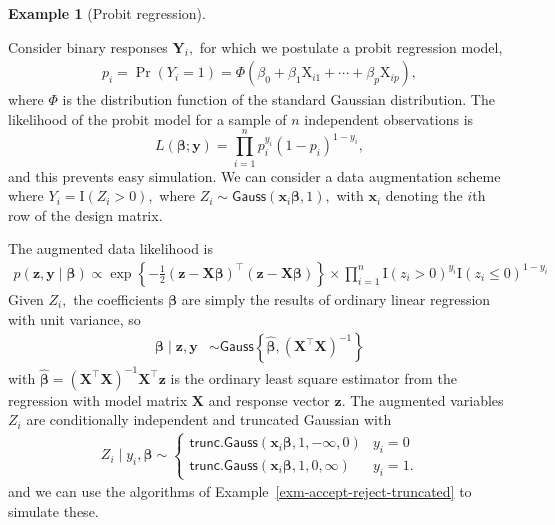 \documentclass[
  11pt,
  letterpaper,
]{scrbook}
\theoremstyle{definition}
\newtheorem{example}{Example}[chapter]
\theoremstyle{plain}
\theoremstyle{plain}
\theoremstyle{plain}
\theoremstyle{definition}
\theoremstyle{definition}
\theoremstyle{plain}
\theoremstyle{plain}
\theoremstyle{remark}
\begin{document}
\begin{example}[Probit
regression]\protect\hypertarget{exm-probit-regression}{}\label{exm-probit-regression}

Consider binary responses \(\boldsymbol{Y}_i,\) for which we postulate a
probit regression model, \begin{align*}
p_i = \Pr(Y_i=1) = \Phi(\beta_0 + \beta_1 \mathrm{X}_{i1} + \cdots + \beta_p\mathrm{X}_{ip}),
\end{align*} where \(\Phi\) is the distribution function of the standard
Gaussian distribution. The likelihood of the probit model for a sample
of \(n\) independent observations is
\[L(\boldsymbol{\beta}; \boldsymbol{y}) = \prod_{i=1}^n p_i^{y_i}(1-p_i)^{1-y_i},\]
and this prevents easy simulation. We can consider a data augmentation
scheme where \(Y_i = \mathrm{I}(Z_i > 0),\) where
\(Z_i \sim \mathsf{Gauss}(\mathbf{x}_i\boldsymbol{\beta}, 1),\) with
\(\mathbf{x}_i\) denoting the \(i\)th row of the design matrix.

The augmented data likelihood is \begin{align*}
p(\boldsymbol{z}, \boldsymbol{y} \mid \boldsymbol{\beta}) \propto \exp\left\{-\frac{1}{2}(\boldsymbol{z} - \mathbf{X}\boldsymbol{\beta})^\top(\boldsymbol{z} - \mathbf{X}\boldsymbol{\beta})\right\} \times \prod_{i=1}^n \mathrm{I}(z_i > 0)^{y_i}\mathrm{I}(z_i \le 0)^{1-y_i}
\end{align*} Given \(Z_i,\) the coefficients \(\boldsymbol{\beta}\) are
simply the results of ordinary linear regression with unit variance, so
\begin{align*}
\boldsymbol{\beta} \mid \boldsymbol{z}, \boldsymbol{y} &\sim \mathsf{Gauss}\left\{\widehat{\boldsymbol{\beta}}, (\mathbf{X}^\top\mathbf{X})^{-1}\right\}
\end{align*} with
\(\widehat{\boldsymbol{\beta}}=(\mathbf{X}^\top\mathbf{X})^{-1}\mathbf{X}^\top\boldsymbol{z}\)
is the ordinary least square estimator from the regression with model
matrix \(\mathbf{X}\) and response vector \(\boldsymbol{z}.\) The
augmented variables \(Z_i\) are conditionally independent and truncated
Gaussian with \begin{align*}
Z_i \mid y_i, \boldsymbol{\beta} \sim \begin{cases}
\mathsf{trunc. Gauss}(\mathbf{x}_i\boldsymbol{\beta},1, -\infty, 0) & y_i =0 \\
\mathsf{trunc. Gauss}(\mathbf{x}_i\boldsymbol{\beta},1,  0, \infty) & y_i =1.
\end{cases}
\end{align*} and we can use the algorithms of
Example~\ref{exm-accept-reject-truncated} to simulate these.


\end{example}
\end{document}
